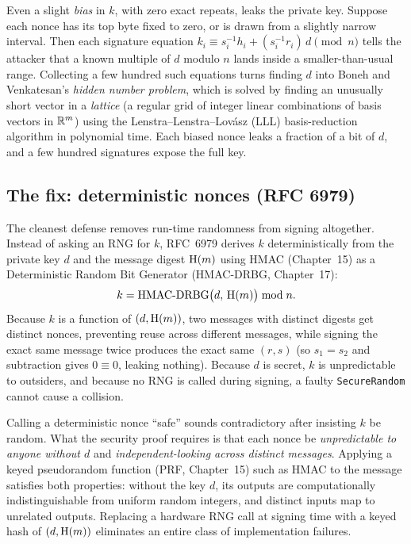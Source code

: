 \begin{connectionbox}
Even a slight \emph{bias} in $k$, with zero exact repeats, leaks the private key. Suppose each nonce has its top byte fixed to zero, or is drawn from a slightly narrow interval. Then each signature equation $k_i \equiv s_i^{-1} h_i + (s_i^{-1} r_i)\,d \pmod n$ tells the attacker that a known multiple of $d$ modulo $n$ lands inside a smaller-than-usual range. Collecting a few hundred such equations turns finding $d$ into Boneh and Venkatesan's \emph{hidden number problem}, which is solved by finding an unusually short vector in a \emph{lattice} (a regular grid of integer linear combinations of basis vectors in $\mathbb{R}^m$) using the Lenstra--Lenstra--Lov\'asz (LLL) basis-reduction algorithm in polynomial time. Each biased nonce leaks a fraction of a bit of $d$, and a few hundred signatures expose the full key.
\end{connectionbox}

\subsection{The fix: deterministic nonces (RFC 6979)}
\label{ch22:rfc6979}

The cleanest defense removes run-time randomness from signing altogether. Instead of asking an RNG for $k$, RFC~6979 derives $k$ deterministically from the private key $d$ and the message digest $\operatorname{H}(m)$ using HMAC (Chapter~15) as a Deterministic Random Bit Generator (HMAC-DRBG, Chapter~17):
\[
  k = \operatorname{HMAC-DRBG}\bigl(d,\, \operatorname{H}(m)\bigr) \bmod n.
\]
Because $k$ is a function of $(d, \operatorname{H}(m))$, two messages with distinct digests get distinct nonces, preventing reuse across different messages, while signing the exact same message twice produces the exact same $(r, s)$ (so $s_1 = s_2$ and subtraction gives $0 \equiv 0$, leaking nothing). Because $d$ is secret, $k$ is unpredictable to outsiders, and because no RNG is called during signing, a faulty \texttt{SecureRandom} cannot cause a collision.

\begin{whybox}
Calling a deterministic nonce ``safe'' sounds contradictory after insisting $k$ be random. What the security proof requires is that each nonce be \emph{unpredictable to anyone without $d$} and \emph{independent-looking across distinct messages}. Applying a keyed pseudorandom function (PRF, Chapter~15) such as HMAC to the message satisfies both properties: without the key $d$, its outputs are computationally indistinguishable from uniform random integers, and distinct inputs map to unrelated outputs. Replacing a hardware RNG call at signing time with a keyed hash of $(d, \operatorname{H}(m))$ eliminates an entire class of implementation failures.
\end{whybox}

